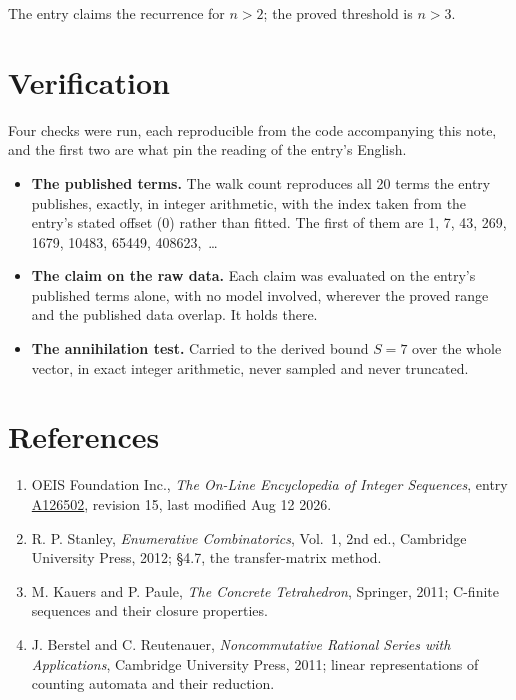 \documentclass[11pt]{article}
\theoremstyle{definition}
\begin{document}
The entry claims the recurrence for $n > 2$; the proved threshold is $n > 3$.

\section{Verification}

Four checks were run, each reproducible from the code accompanying this note, and the first two are what pin the reading of the entry's English.

\begin{itemize}

\item {\bfseries The published terms.} The walk count reproduces all 20 terms the entry publishes, exactly, in integer arithmetic, with the index taken from the entry's stated offset (0) rather than fitted. The first of them are 1, 7, 43, 269, 1679, 10483, 65449, 408623,~\dots

\item {\bfseries The claim on the raw data.} Each claim was evaluated on the entry's published terms alone, with no model involved, wherever the proved range and the published data overlap. It holds there.

\item {\bfseries The annihilation test.} Carried to the derived bound $S = 7$ over the whole vector, in exact integer arithmetic, never sampled and never truncated.

\end{itemize}

\section{References}

\begin{enumerate}

\item OEIS Foundation Inc., \emph{The On-Line Encyclopedia of Integer Sequences}, entry \href{https://oeis.org/A126502}{A126502}, revision 15, last modified Aug 12 2026.

\item R. P. Stanley, \emph{Enumerative Combinatorics}, Vol.~1, 2nd ed., Cambridge University Press, 2012; \S4.7, the transfer-matrix method.

\item M. Kauers and P. Paule, \emph{The Concrete Tetrahedron}, Springer, 2011; C-finite sequences and their closure properties.

\item J. Berstel and C. Reutenauer, \emph{Noncommutative Rational Series with Applications}, Cambridge University Press, 2011; linear representations of counting automata and their reduction.

\end{enumerate}
\end{document}
